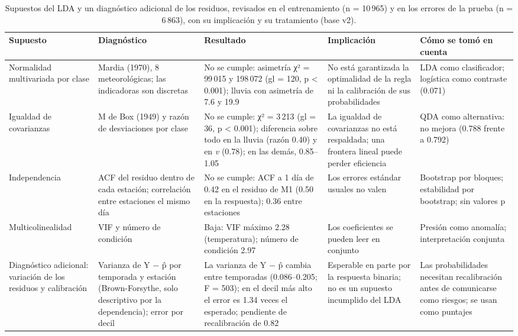 \begin{table}[!htbp]
\centering\footnotesize
\caption{Supuestos del LDA y un diagnóstico adicional de los residuos, revisados en el entrenamiento (n = 10\,965) y en los errores de la prueba (n = 6\,863), con su implicación y su tratamiento (base v2).}
\label{tbl:supuestos}
\begin{tabularx}{\textwidth}{>{\raggedright\arraybackslash}p{2.45cm}>{\raggedright\arraybackslash}p{2.7cm}LLL}
\toprule
Supuesto & Diagnóstico & Resultado & Implicación & Cómo se tomó en cuenta\\
\midrule
Normalidad multivariada por clase & Mardia (1970), 8 meteorológicas; las indicadoras son discretas & No se cumple: asimetría χ² = 99\,015 y 198\,072 (gl = 120, p < 0.001); lluvia con asimetría de 7.6 y 19.9 & No está garantizada la optimalidad de la regla ni la calibración de sus probabilidades & LDA como clasificador; logística como contraste (0.071)\\
Igualdad de covarianzas & M de Box (1949) y razón de desviaciones por clase & No se cumple: χ² = 3\,213 (gl = 36, p < 0.001); diferencia sobre todo en la lluvia (razón 0.40) y en \emph{v} (0.78); en las demás, 0.85–1.05 & La igualdad de covarianzas no está respaldada; una frontera lineal puede perder eficiencia & QDA como alternativa: no mejora (0.788 frente a 0.792)\\
Independencia & ACF del residuo dentro de cada estación; correlación entre estaciones el mismo día & No se cumple: ACF a 1 día de 0.42 en el residuo de M1 (0.50 en la respuesta); 0.36 entre estaciones & Los errores estándar usuales no valen & Bootstrap por bloques; estabilidad por bootstrap; sin valores p\\
Multicolinealidad & VIF y número de condición & Baja: VIF máximo 2.28 (temperatura); número de condición 2.97 & Los coeficientes se pueden leer en conjunto & Presión como anomalía; interpretación conjunta\\
Diagnóstico adicional: variación de los residuos y calibración & Varianza de Y − \^{p} por temporada y estación (Brown-Forsythe, solo descriptivo por la dependencia); error por decil & La varianza de Y − \^{p} cambia entre temporadas (0.086–0.205; F = 503); en el decil más alto el error es 1.34 veces el esperado; pendiente de recalibración de 0.82 & Esperable en parte por la respuesta binaria; no es un supuesto incumplido del LDA & Las probabilidades necesitan recalibración antes de comunicarse como riesgos; se usan como puntajes\\
\bottomrule
\end{tabularx}
\end{table}

